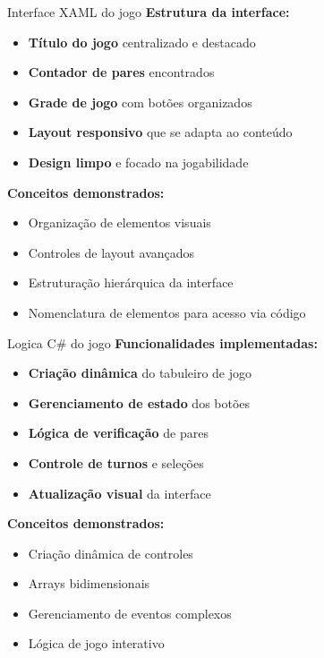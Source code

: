 \documentclass[aspectratio=169]{beamer}
\begin{document}
\begin{frame}{Interface XAML do jogo}
\textbf{Estrutura da interface:}
\begin{itemize}
    \item \textbf{Título do jogo} centralizado e destacado
    \item \textbf{Contador de pares} encontrados
    \item \textbf{Grade de jogo} com botões organizados
    \item \textbf{Layout responsivo} que se adapta ao conteúdo
    \item \textbf{Design limpo} e focado na jogabilidade
\end{itemize}

\textbf{Conceitos demonstrados:}
\begin{itemize}
    \item Organização de elementos visuais
    \item Controles de layout avançados
    \item Estruturação hierárquica da interface
    \item Nomenclatura de elementos para acesso via código
\end{itemize}
\end{frame}

\begin{frame}{Logica C\# do jogo}
\textbf{Funcionalidades implementadas:}
\begin{itemize}
    \item \textbf{Criação dinâmica} do tabuleiro de jogo
    \item \textbf{Gerenciamento de estado} dos botões
    \item \textbf{Lógica de verificação} de pares
    \item \textbf{Controle de turnos} e seleções
    \item \textbf{Atualização visual} da interface
\end{itemize}

\textbf{Conceitos demonstrados:}
\begin{itemize}
    \item Criação dinâmica de controles
    \item Arrays bidimensionais
    \item Gerenciamento de eventos complexos
    \item Lógica de jogo interativo
\end{itemize}
\end{frame}
\end{document}
